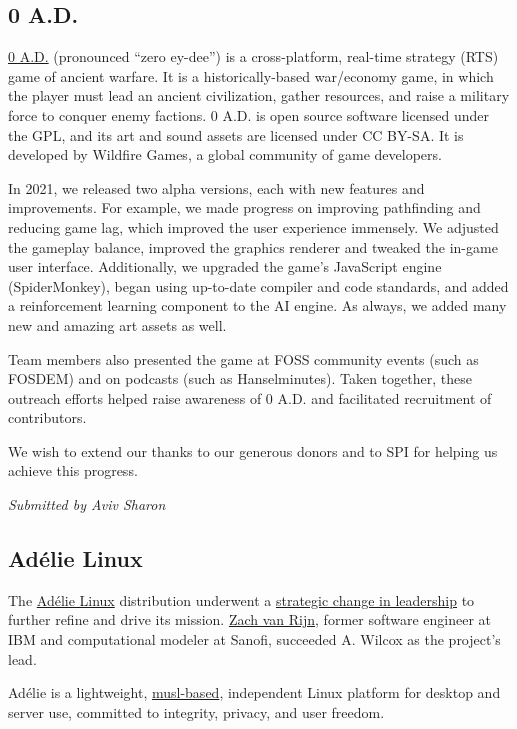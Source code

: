 \documentclass[a4paper]{report}
\begin{document}
\subsection{0 A.D.}

\href{https://play0ad.com/}{0 A.D.} (pronounced ``zero ey-dee'') is a cross-platform, real-time strategy (RTS) game of ancient warfare. It is a historically-based war/economy game, in which the player must lead an ancient civilization, gather resources, and raise a military force to conquer enemy factions. 0 A.D. is open source software licensed under the GPL, and its art and sound assets are licensed under CC BY-SA. It is developed by Wildfire Games, a global community of game developers.

In 2021, we released two alpha versions, each with new features and improvements. For example, we made progress on improving pathfinding and reducing game lag, which improved the user experience immensely. We adjusted the gameplay balance, improved the graphics renderer and tweaked the in-game user interface. Additionally, we upgraded the game's JavaScript engine (SpiderMonkey), began using up-to-date compiler and code standards, and added a reinforcement learning component to the AI engine. As always, we added many new and amazing art assets as well.

Team members also presented the game at FOSS community events (such as FOSDEM) and on podcasts (such as Hanselminutes). Taken together, these outreach efforts helped raise awareness of 0 A.D. and facilitated recruitment of contributors.

We wish to extend our thanks to our generous donors and to SPI for helping us achieve this progress.

{\em Submitted by Aviv Sharon}

\subsection{Adélie Linux}

The \href{https://www.adelielinux.org/}{Adélie Linux} distribution underwent a \href{https://blog.adelielinux.org/2021/07/22/2021-state-of-the-adelie-linux-distribution/}{strategic change in leadership} to further refine and drive its mission.  \href{https://zv.io/about/}{Zach van Rijn}, former software engineer at IBM and computational modeler at Sanofi, succeeded A. Wilcox as the project's lead.

Adélie is a lightweight, \href{https://musl.libc.org/}{{musl-based}}, independent Linux platform for desktop and server use, committed to integrity, privacy, and user freedom.
\end{document}

